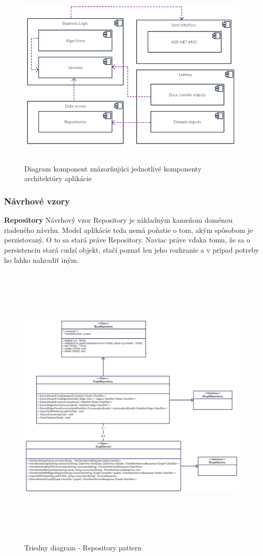 \documentclass[slovak,master,public,dept460,male,cpdeclaration,oneside]{diploma}
\begin{document}
\begin{figure}[H]
\centering
\includegraphics[width=15cm, height=9cm]{figures/diagram_komponent}
\caption{Diagram komponent znázorňujúci jednotlivé komponenty architektúry aplikácie}
\end{figure}

\subsubsection{Návrhové vzory}

\indent
\indent \textbf{Repository}
Návrhový vzor Repository je základným kameňom doménou riadeného návrhu. Model aplikácie teda nemá poňatie o tom, akým spôsobom je perzistovaný. O to sa stará práve Repository. Naviac práve vďaka tomu, že sa o persistenciu stará cudzí objekt, stačí poznať len jeho rozhranie a v prípad potreby ho ľahko nahradiť iným. \cite{11}

\begin{figure}[H]
\centering
\includegraphics[width=13cm, height=14cm]{figures/diagram_class}
\caption{Triedny diagram - Repository pattern}
\end{figure}
\end{document}
